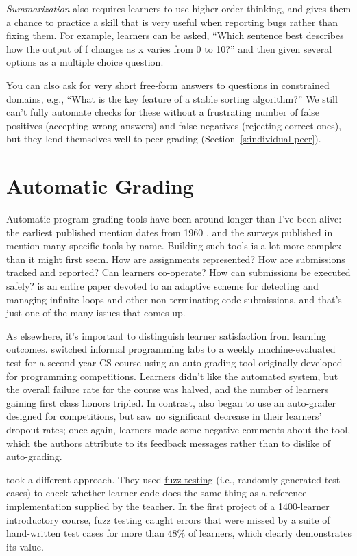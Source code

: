\emph{Summarization} also requires learners to use higher-order thinking, and
gives them a chance to practice a skill that is very useful when
reporting bugs rather than fixing them. For example, learners can be
asked, ``Which sentence best describes how the output of f changes as x
varies from 0 to 10?'' and then given several options as a multiple
choice question.

You can also ask for very short free-form answers to questions in
constrained domains, e.g., ``What is the key feature of a stable sorting
algorithm?'' We still can't fully automate checks for these without a
frustrating number of false positives (accepting wrong answers) and
false negatives (rejecting correct ones), but they lend themselves well
to peer grading (Section~\ref{s:individual-peer}).

\section{Automatic Grading}\label{s:exercises-grading}

Automatic program grading tools have been around longer than I've been
alive: the earliest published mention dates from 1960
\cite{Holl1960}, and the surveys published in
\cite{Douc2005,Ihan2010} mention many specific tools by name.
Building such tools is a lot more complex than it might first seem. How
are assignments represented? How are submissions tracked and reported?
Can learners co-operate? How can submissions be executed safely?
\cite{Edwa2014a} is an entire paper devoted to an adaptive scheme for
detecting and managing infinite loops and other non-terminating code
submissions, and that's just one of the many issues that comes up.

As elsewhere, it's important to distinguish learner satisfaction from
learning outcomes. \cite{Magu2018} switched informal programming labs
to a weekly machine-evaluated test for a second-year CS course using an
auto-grading tool originally developed for programming competitions.
Learners didn't like the automated system, but the overall failure rate
for the course was halved, and the number of learners gaining first
class honors tripled. In contrast, \cite{Rubi2014} also began to use
an auto-grader designed for competitions, but saw no significant
decrease in their learners' dropout rates; once again, learners made
some negative comments about the tool, which the authors attribute to
its feedback messages rather than to dislike of auto-grading.

\cite{Srid2016} took a different approach. They used
\protect\hyperlink{g:fuzz-testing}{fuzz testing} (i.e., randomly-generated
test cases) to check whether learner code does the same thing as a
reference implementation supplied by the teacher. In the first project
of a 1400-learner introductory course, fuzz testing caught errors that
were missed by a suite of hand-written test cases for more than 48\% of
learners, which clearly demonstrates its value.

